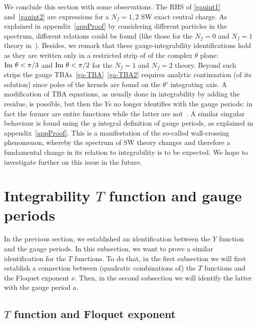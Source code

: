 \documentclass[11pt,a4paper]{elsarticle}
\def \th {\theta}
\def\Im{{\rm Im ~}}
\def\th{\theta}
\numberwithin{figure}{section}
\numberwithin{table}{section}
\begin{document}
We conclude this section with some observations. The RHS of \eqref{gauint1} and~\eqref{gauint2} are expressions for a $N_f=1,2$ SW exact central charge. As explained in appendix~\ref{appProof} by considering different particles in the spectrum, different relations could be found (like those for the $N_f=0$ and $N_f=1$ theory in~\cite{GrassiGuMarino,GrassiHaoNeitzke:2021}). Besides, we remark that these gauge-integrability identifications hold as they are written only in a restricted strip of of the complex $\th$ plane: $\Im \th<\pi/3$ and $\Im \th < \pi/2 $ for the $N_f=1$ and $N_f=2$ theory. Beyond such strips the gauge TBAs~\eqref{ga-TBA}~\eqref{ga-TBA2} requires analytic continuation (of its solution) since poles of the kernels are found on the $\th'$ integrating axis. A modification of TBA equations, as usually done in integrability by adding the residue, is possible, but then the $Y$s no longer identifies with the gauge periods: in fact the former are entire functions while the latter are not~\cite{DestriDeVega:1997,CecottiDelZotto:2014,ItoMarinoShu:2018}. A similar singular behaviour is found using the $y$ integral definition of gauge periods, as explained in appendix~\ref{appProof}. This is a manifestation of the so-called wall-crossing phenomenon, whereby the spectrum of SW theory changes and therefore a fundamental change in its relation to integrability is to be expected. We hope to investigate further on this issue in the future.



\section{Integrability $T$ function and gauge periods} \label{secT}

In the previous section, we established an identification between the $Y$ function and the gauge periods. In this subsection, we want to prove a similar identification for the $T$ functions. To do that, in the first subsection we will first establish a connection between (quadratic combinations of) the $T$ functions and the Floquet exponent $\nu$. Then, in the second subsection we will identify the latter with the gauge period $a$.

\subsection{$T$ function and Floquet exponent}
\end{document}

